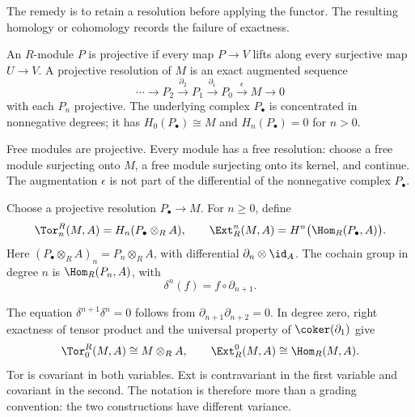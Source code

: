 \documentclass[11pt]{article}
\begin{document}
The remedy is to retain a resolution before applying the functor. The resulting homology or cohomology records the failure of exactness.

\begin{definition}\label{def:resolution}
An $R$-module $P$ is projective if every map $P\to V$ lifts along every surjective map $U\to V$. A projective resolution of $M$ is an exact augmented sequence
\[
\cdots\longrightarrow P_2\xrightarrow{\partial_2}P_1
\xrightarrow{\partial_1}P_0\xrightarrow{\epsilon}M\longrightarrow0
\]
with each $P_n$ projective. The underlying complex $P_\bullet$ is concentrated in nonnegative degrees; it has $H_0(P_\bullet)\cong M$ and $H_n(P_\bullet)=0$ for $n>0$.
\end{definition}
Free modules are projective. Every module has a free resolution: choose a free module surjecting onto $M$, a free module surjecting onto its kernel, and continue. The augmentation $\epsilon$ is not part of the differential of the nonnegative complex $P_\bullet$.

\hypertarget{def:derived}{}
\begin{definition}\label{def:derivedlabel}
Choose a projective resolution $P_\bullet\to M$. For $n\geq0$, define
\[
\Tor_n^R(M,A)=H_n(P_\bullet\otimes_R A),\qquad
\Ext_R^n(M,A)=H^n\bigl(\Hom_R(P_\bullet,A)\bigr).
\]
Here $(P_\bullet\otimes_R A)_n=P_n\otimes_R A$, with differential $\partial_n\otimes\id_A$. The cochain group in degree $n$ is $\Hom_R(P_n,A)$, with
\[
\delta^n(f)=f\circ\partial_{n+1}.
\]
\end{definition}
The equation $\delta^{n+1}\delta^n=0$ follows from $\partial_{n+1}\partial_{n+2}=0$. In degree zero, right exactness of tensor product and the universal property of $\coker(\partial_1)$ give
\[
\Tor_0^R(M,A)\cong M\otimes_R A,
\qquad
\Ext_R^0(M,A)\cong\Hom_R(M,A).
\]
Tor is covariant in both variables. Ext is contravariant in the first variable and covariant in the second. The notation is therefore more than a grading convention: the two constructions have different variance.
\end{document}
